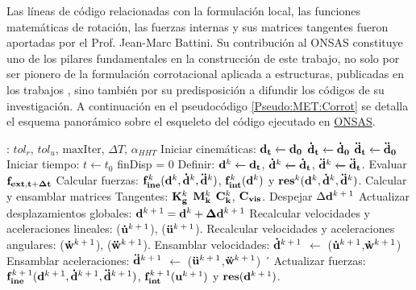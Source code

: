 Las líneas de código relacionadas con la formulación local, las funciones matemáticas de rotación, las fuerzas internas y sus matrices tangentes fueron aportadas por el Prof. Jean-Marc Battini. Su contribución al ONSAS constituye uno de los pilares fundamentales en la construcción de este trabajo, no solo por ser pionero de la formulación corrotacional aplicada a estructuras, publicadas en los trabajos \citep{Battini2002} \citep{Le2014}, sino también por su predisposición a difundir los códigos de su investigación. A continuación en el pseudocódigo \ref{Pseudo:MET:Corrot} se detalla el esquema panorámico sobre el esqueleto del código ejecutado en \href{https://github.com/ONSAS/ONSAS.m/}{ONSAS}. 

\begin{algorithm}
\begin{algorithmic} 
	\REQUIRE: $tol_r$, $tol_u$, $\text{maxIter}$, $\Delta T$, $\alpha_{HHT}$
	\STATE Iniciar cinemáticas: $\bf{d_t}\xleftarrow[]{}\bf{d_0}$
	$\bf{\dot{d}_t}\xleftarrow[]{}\bf{\dot{d}_0}$
	$\bf{\ddot{d}_t}\xleftarrow[]{}\bf{\ddot{d}_0}$ 
	\STATE Iniciar tiempo: $t\xleftarrow{}t_0$
	\STATE finDisp = $0$
	\STATE Definir: $\bf{d^\text{$k$}}\xleftarrow[]{}\bf{d_t}$, $\bf{\dot{d}^\text{$k$}}\xleftarrow[]{}\bf{\dot{d}_t}$, $\bf{\ddot{d}^\text{$k$}}\xleftarrow[]{}\bf{\ddot{d}_t}$.
	\STATE Evaluar $\bf{f_{ext,t+\Delta t}}$	
	\STATE Calcular fuerzas: $\bf{f}_{ine}^\text{$k$}(\bf{d}^\text{$k$},\bf{\dot{d}}^\text{$k$},\bf{\ddot{d}}^\text{$k$})$,  $\bf{f}_{int}^\text{$k$}(\bf{d}^\text{$k$})$ y $\bf{res}^{\text{$k$}}(\bf{d}^\text{$k$},\bf{\dot{d}}^\text{$k$},\bf{\ddot{d}}^\text{$k$})$. 
	\STATE Calcular y ensamblar matrices Tangentes: $\bf{K}_g^\text{$k$}$ $\bf{M}_k^\text{$k$}$  $\bf{C}_k^\text{$k$}$, $\bf{C}_{vis}$. 
	\STATE Despejar $\Delta \bf{d}^\text{$k+1$}$ 
	\STATE Actualizar desplazamientos globales:  $\bf{d}^\text{$k+1$} = \bf{d}^\text{$k$} + \Delta\bf{d}^\text{$k+1$}$ 
	\STATE Recalcular velocidades y aceleraciones lineales: ($\bf{\dot{u}}^\text{$k+1$}$), ($\bf{\ddot{u}}^\text{$k+1$}$).
	\STATE Recalcular velocidades y aceleraciones angulares: ($\bf{\dot{w}}^\text{$k+1$}$), ($\bf{\ddot{w}}^\text{$k+1$}$).
	\STATE Ensamblar velocidades: $\bf{\dot{d}}^\text{$k+1$}$ $\leftarrow$ ($\bf{\dot{u}}^\text{$k+1$}$,$\bf{\dot{w}}^\text{$k+1$}$)
	\STATE Ensamblar aceleraciones: $\bf{\ddot{d}}^\text{$k+1$}$ $\leftarrow$ ($\bf{\ddot{u}}^\text{$k+1$}$,$\bf{\ddot{w}}^\text{$k+1$}$)
	´				\STATE Actualizar fuerzas: 	$\bf{f}_{ine}^\text{$k+1$}(\bf{d}^\text{$k+1$},\bf{\dot{d}}^\text{$k+1$},\bf{\ddot{d}}^\text{$k+1$})$,  $\bf{f}_{int}^\text{$k+1$}(\bf{u}^\text{$k+1$})$ y $\bf{res}(\bf{d}^\text{$k+1$})$. 

\end{algorithmic}
\end{algorithm}
